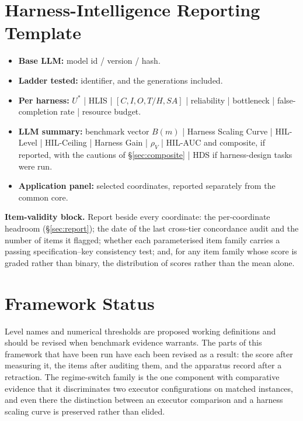 \documentclass[11pt]{article}
\theoremstyle{definition}
\newcommand{\rhov}{\ensuremath{\rho_V}}
\begin{document}
\section{Harness-Intelligence Reporting Template}

\begin{itemize}
\item \textbf{Base LLM:} model id / version / hash.
\item \textbf{Ladder tested:} identifier, and the generations included.
\item \textbf{Per harness:} $U^{*}$ | HLIS | $[C,I,O,T/H,SA]$ | reliability | bottleneck | false-completion rate | resource budget.
\item \textbf{LLM summary:} benchmark vector $B(m)$ | Harness Scaling Curve | HIL-Level | HIL-Ceiling | Harness Gain | \rhov{} | HIL-AUC and composite, if reported, with the cautions of \S\ref{sec:composite} | HDS if harness-design tasks were run.
\item \textbf{Application panel:} selected coordinates, reported separately from the common core.
\end{itemize}

\noindent\textbf{Item-validity block.} Report beside every coordinate: the per-coordinate headroom (\S\ref{sec:report}); the date of the last cross-tier concordance audit and the number of items it flagged; whether each parameterised item family carries a passing specification--key consistency test; and, for any item family whose score is graded rather than binary, the distribution of scores rather than the mean alone.

\section{Framework Status}

Level names and numerical thresholds are proposed working definitions and should be revised when benchmark evidence warrants. The parts of this framework that have been run have each been revised as a result: the score after measuring it, the items after auditing them, and the apparatus record after a retraction. The regime-switch family is the one component with comparative evidence that it discriminates two executor configurations on matched instances, and even there the distinction between an executor comparison and a harness scaling curve is preserved rather than elided.
\end{document}
